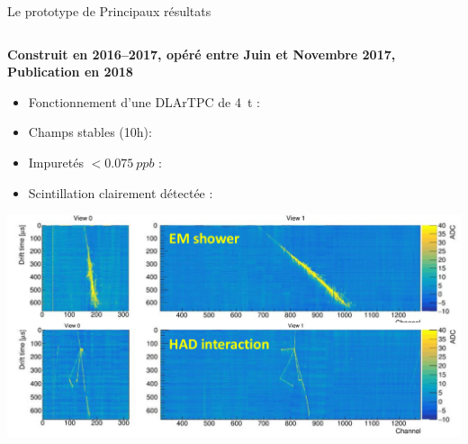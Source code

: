    	\begin{frame}{Le prototype de \TOO{}}{Principaux résultats}
       	\begin{scriptsize}
           	\begin{columns}
               	\begin{column}{0.5\textwidth}
                   	\textbf{Construit en 2016--2017, opéré entre Juin et Novembre 2017, Publication en 2018}\\
       	           	\begin{itemize}
           	           	\item Fonctionnement d'une DLArTPC de \SI{4}{\tonne} : \textcolor{green}{\checkmark}
       	               	\item Champs stables (10h):
       	               	\begin{itemize}
       	               	\end{itemize}
       	               	\item Impuretés $<\SI{0.075}{ppb}$ : \textcolor{green}{\checkmark}
       	               	\item Scintillation clairement détectée : \textcolor{green}{\checkmark}
       	           	\end{itemize}
       	           	\hspace{-0.3cm}\includegraphics[width=1.2\textwidth]{./pictures/events.png}
               	\end{column}

\end{columns}
\end{scriptsize}
\end{frame}
